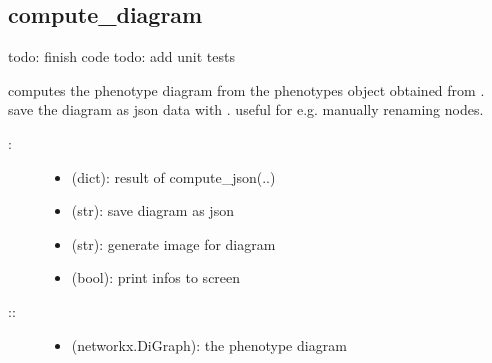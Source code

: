 \documentclass[letterpaper,10pt,english]{sphinxmanual}
\begin{document}
\begin{fulllineitems}
\end{fulllineitems}



\subsection{compute\_diagram}
\label{\detokenize{Phenotypes:phenotypes-compute-diagram}}\label{\detokenize{Phenotypes:compute-diagram}}

\begin{fulllineitems}
\label{\detokenize{Phenotypes:PyBoolNet.Phenotypes.compute_diagram}}
todo: finish code
todo: add unit tests

computes the phenotype diagram from the phenotypes object obtained from {\hyperref[\detokenize{Phenotypes:phenotypes-compute-json}]{}}.
save the diagram as json data with . useful for e.g. manually renaming nodes.
\begin{description}
\item[{:}] \leavevmode\begin{itemize}
\item {} 
 (dict): result of compute\_json(..)

\item {} 
 (str): save diagram as json

\item {} 
 (str): generate image for diagram

\item {} 
 (bool): print infos to screen

\end{itemize}

\item[{::}] \leavevmode\begin{itemize}
\item {} 
 (networkx.DiGraph): the phenotype diagram

\end{itemize}

\end{description}


\end{fulllineitems}
\end{document}
